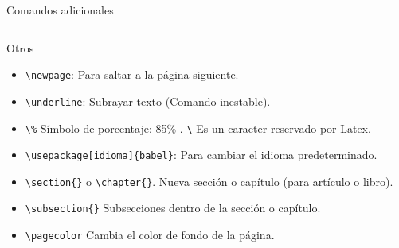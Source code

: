 \documentclass[aspectratio=169, 10pt]{beamer}
\begin{document}
\begin{frame}[fragile]{Comandos adicionales}
    \begin{columns}
        \begin{column}{.65\linewidth}    
            \begin{block}{Otros}
            \begin{itemize} \pause
                \item \verb|\newpage|: Para saltar a la página siguiente. \pause
                \item  \verb|\underline|: \underline{Subrayar texto (Comando inestable).} \pause
                \item \verb|\%| Símbolo de porcentaje: 85\% . \verb|\| Es un caracter reservado por Latex. \pause
                \item \verb|\usepackage[idioma]{babel}|: Para cambiar el idioma predeterminado. \pause
                \item \verb|\section{}| o \verb|\chapter{}|. Nueva sección o capítulo (para artículo o libro). \pause
                \item \verb|\subsection{}| Subsecciones dentro de la sección o capítulo.
                \item \verb|\pagecolor| Cambia el color de fondo de la página.
            \end{itemize}
            \end{block} 
        \end{column}    
    \end{columns}
\end{frame}
\end{document}
